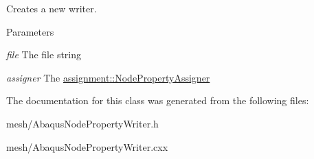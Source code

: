 Creates a new writer. 


\begin{DoxyParams}{Parameters}
\item[{\em file}]The file string \item[{\em assigner}]The \hyperlink{classassignment_1_1_node_property_assigner}{assignment::NodePropertyAssigner} \end{DoxyParams}


The documentation for this class was generated from the following files:\begin{DoxyCompactItemize}
\item 
mesh/AbaqusNodePropertyWriter.h\item 
mesh/AbaqusNodePropertyWriter.cxx\end{DoxyCompactItemize}
